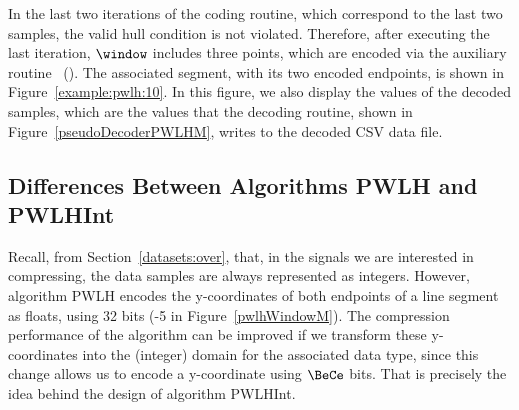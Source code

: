 \vspace{+5pt}


\clearpage


In the last two iterations of the coding routine, which correspond to the last two samples, the valid hull condition is not violated. Therefore, after executing the last iteration, $\window$ includes three points, which are encoded via the auxiliary routine \EncodeLastWindowPWLH\ (). The associated segment, with its two encoded endpoints, is shown in Figure~\ref{example:pwlh:10}. In this figure, we also display the values of the decoded samples, which are the values that the decoding routine, shown in Figure~\ref{pseudoDecoderPWLHM}, writes to the decoded CSV data file. 






\subsection{Differences Between Algorithms PWLH and PWLHInt}
\label{algo:pwhl:int}


Recall, from Section~\ref{datasets:over}, that, in the signals we are interested in compressing, the data samples are always represented as integers. However, algorithm PWLH encodes the y-coordinates of both endpoints of a line segment as floats, using 32 bits (-5 in Figure~\ref{pwlhWindowM}). The compression performance of the algorithm can be improved if we transform these y-coordinates into the (integer) domain for the associated data type, since this change allows us to encode a y-coordinate using $\BeCe$ bits. That is precisely the idea behind the design of algorithm PWLHInt.


